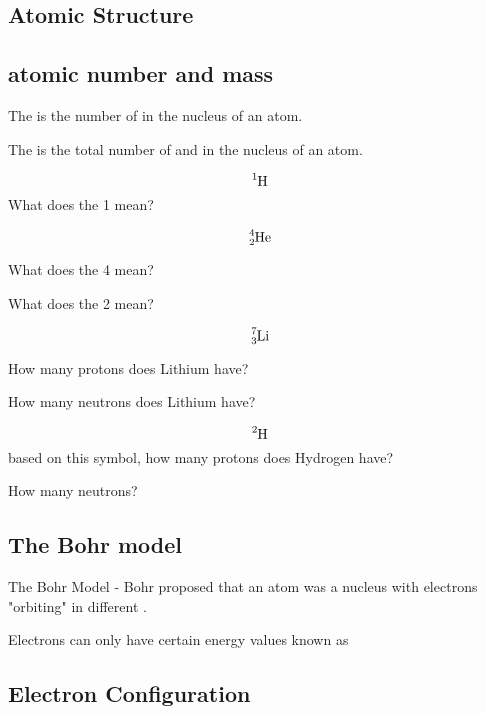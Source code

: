 \documentclass[12pt,answers]{exam}
\begin{document}
\twocolumn
    
\begin{questions}
        
\section{Atomic Structure}

\subsection{atomic number and mass}

\question The  is the number of \fillin[protons][3cm] in the nucleus of an atom.

\question The  is the total number of \fillin[protons][2cm] and \fillin[neutrons][2cm]in the nucleus of an atom.



\question $$\ce{^{1}_{}H}$$
What does the 1 mean?



$$\ce{^{4}_{2}He}$$

\question What does the 4 mean? 


\question What does the 2 mean?

\fillin[\# of neutrons][6cm]

\question $$\ce{^{7}_{3}Li}$$

How many protons does Lithium have? \fillin[3][2cm]

How many neutrons does Lithium have? \fillin[7 - 3 = 4][2cm]

\question $$\ce{^{2}_{}H}$$ based on this symbol, how many protons does Hydrogen have? \fillin[1][1cm]

How many neutrons? \fillin[1][1cm]

\subsection{The Bohr model}

\question   The Bohr Model - Bohr proposed that an atom was a nucleus with electrons "orbiting" in different .

\question Electrons can only have certain energy values known as 

\subsection{Electron Configuration}


\end{questions}
\end{document}
